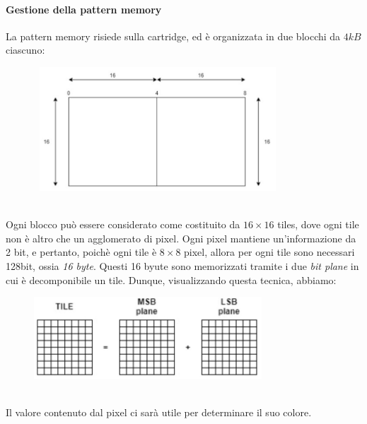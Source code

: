 \documentclass[11pt]{article}
\begin{document}
\paragraph{Gestione della pattern memory} La pattern memory risiede sulla cartridge, ed è organizzata in due blocchi da $4kB$ ciascuno:
\begin{figure}[h]
\centering
\includegraphics[width=350px, height=175px]{PATTERNMEM.jpg}
\end{figure}\\
Ogni blocco può essere considerato come costituito da $16\times16$ tiles, dove ogni tile non è altro che un agglomerato di pixel. Ogni pixel mantiene un'informazione da 2 bit, e pertanto, poichè ogni tile è $8\times8$ pixel, allora per ogni tile sono necessari 128bit, ossia \emph{16 byte}. Questi 16 byute sono memorizzati tramite i due \emph{bit plane} in cui è decomponibile un tile. Dunque, visualizzando questa tecnica, abbiamo:
\begin{figure}[h]
\centering
\includegraphics[width=322px, height=116px]{TILE_STORING.jpg}
\end{figure}\\
Il valore contenuto dal pixel ci sarà utile per determinare il suo colore.
\clearpage
\end{document}
